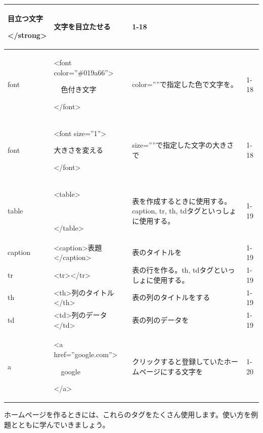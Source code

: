 \documentclass[a4paper,12pt]{jarticle}
\begin{document}
{\begin{center}
\begin{supertabular}{|m{2.171cm}|m{4.1060004cm}|m{7.8930006cm}|m{2.037cm}|}
      目立つ文字

      {\textless}/strong{\textgreater} &
      文字を目立たせる &
      1-18\\\hline
      font  &
      {\textless}font color=”\#019a66”{\textgreater}

      \ \ 色付き文字

      {\textless}/font{\textgreater} &
      color=””で指定した色で文字を。 &
      1-18\\\hline
      font &
      {\textless}font size=”1”{\textgreater}

      大きさを変える

      {\textless}/font{\textgreater} &
      size=””で指定した文字の大きさで &
      1-18\\\hline
      table &
      {\textless}table{\textgreater}

      ~

      {\textless}/table{\textgreater} &
      表を作成するときに使用する。caption, tr, th,
      tdタグといっしょに使用する。 &
      1-19\\\hline
      caption &
      {\textless}caption{\textgreater}表題{\textless}/caption{\textgreater} &
      表のタイトルを &
      1-19\\\hline
      tr &
      {\textless}tr{\textgreater}{\textless}/tr{\textgreater} &
      表の行を作る。th,
      tdタグといっしょに使用する。 &
      1-19\\\hline
      th &
      {\textless}th{\textgreater}列のタイトル{\textless}/th{\textgreater} &
      表の列のタイトルをする &
      1-19\\\hline
      td &
      {\textless}td{\textgreater}列のデータ{\textless}/td{\textgreater} &
      表の列のデータを &
      1-19\\\hline
      a &
      {\textless}a href=”google.com”{\textgreater}

      \ \ google

        {\textless}/a{\textgreater} &
      クリックすると登録していたホームページにする文字を
      &
      1-20\\\hline
    \end{supertabular}
  \end{center}
}

\bigskip
ホームページを作るときには、これらのタグをたくさん使用します。使い方を例題とともに学んでいきましょう。
\end{document}
